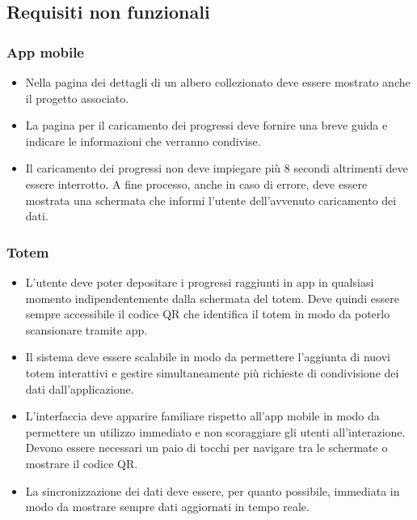 \subsection{Requisiti non funzionali}
\subsubsection{App mobile}
\begin{itemize}
    \item Nella pagina dei dettagli di un albero collezionato deve essere mostrato anche il progetto associato.
    \item La pagina per il caricamento dei progressi deve fornire una breve guida e indicare le informazioni che verranno condivise.
    \item Il caricamento dei progressi non deve impiegare più 8 secondi altrimenti deve essere interrotto. A fine processo, anche in caso di errore, deve essere mostrata una schermata che informi l'utente dell'avvenuto caricamento dei dati.
\end{itemize}
\subsubsection{Totem}
\begin{itemize}
    \item L'utente deve poter depositare i progressi raggiunti in app in qualsiasi momento indipendentemente dalla schermata del totem. Deve quindi essere sempre accessibile il codice QR che identifica il totem in modo da poterlo scansionare tramite app.
    \item Il sistema deve essere scalabile in modo da permettere l'aggiunta di nuovi totem interattivi e gestire simultaneamente più richieste di condivisione dei dati dall'applicazione.
    \item L'interfaccia deve apparire familiare rispetto all'app mobile in modo da permettere un utilizzo immediato e non scoraggiare gli utenti all'interazione. Devono essere necessari un paio di tocchi per navigare tra le schermate o mostrare il codice QR.
    \item La sincronizzazione dei dati deve essere, per quanto possibile, immediata in modo da mostrare sempre dati aggiornati in tempo reale.
\end{itemize}

